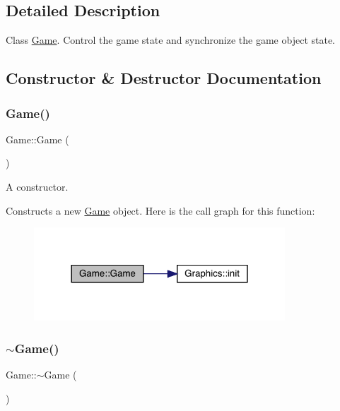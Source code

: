 \subsection{Detailed Description}
Class \mbox{\hyperlink{class_game}{Game}}. Control the game state and synchronize the game object state. 

\subsection{Constructor \& Destructor Documentation}
\mbox{\label{class_game_ad59df6562a58a614fda24622d3715b65}} 
\subsubsection{\texorpdfstring{Game()}{Game()}}
{\footnotesize\ttfamily Game\+::\+Game (\begin{DoxyParamCaption}{ }\end{DoxyParamCaption})}



A constructor. 

Constructs a new \mbox{\hyperlink{class_game}{Game}} object. Here is the call graph for this function\+:
\nopagebreak
\begin{figure}[H]
\begin{center}
\leavevmode
\includegraphics[width=266pt]{class_game_ad59df6562a58a614fda24622d3715b65_cgraph}
\end{center}
\end{figure}
\mbox{\label{class_game_ae3d112ca6e0e55150d2fdbc704474530}} 
\subsubsection{\texorpdfstring{$\sim$\+Game()}{~Game()}}
{\footnotesize\ttfamily Game\+::$\sim$\+Game (\begin{DoxyParamCaption}{ }\end{DoxyParamCaption})}



